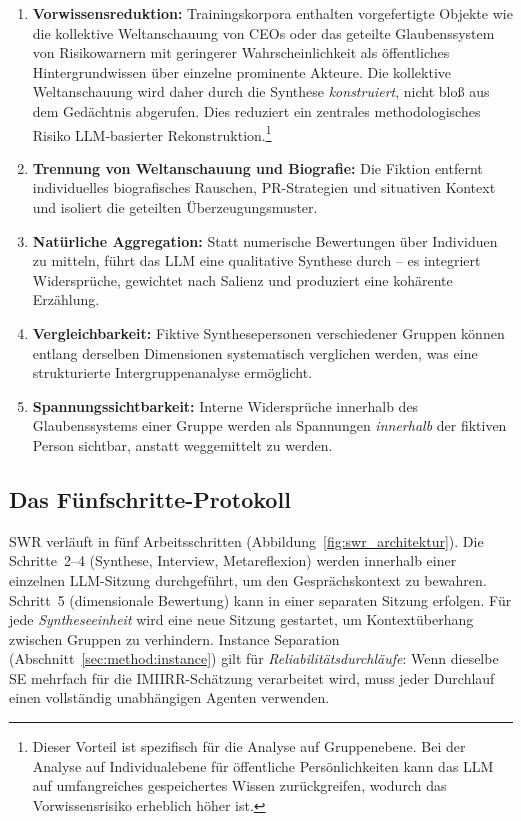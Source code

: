 \documentclass[11pt,a4paper]{article}
\begin{document}
\begin{enumerate}[nosep]
  \item \textbf{Vorwissensreduktion:} Trainingskorpora enthalten vorgefertigte Objekte wie \glqq{}die kollektive Weltanschauung von CEOs\grqq{} oder \glqq{}das geteilte Glaubenssystem von Risikowarnern\grqq{} mit geringerer Wahrscheinlichkeit als öffentliches Hintergrundwissen über einzelne prominente Akteure. Die kollektive Weltanschauung wird daher durch die Synthese \emph{konstruiert}, nicht bloß aus dem Gedächtnis abgerufen. Dies reduziert ein zentrales methodologisches Risiko LLM-basierter Rekonstruktion.\footnote{Dieser Vorteil ist spezifisch für die Analyse auf Gruppenebene. Bei der Analyse auf Individualebene für öffentliche Persönlichkeiten kann das LLM auf umfangreiches gespeichertes Wissen zurückgreifen, wodurch das Vorwissensrisiko erheblich höher ist.}
  \item \textbf{Trennung von Weltanschauung und Biografie:} Die Fiktion entfernt individuelles biografisches Rauschen, PR-Strategien und situativen Kontext und isoliert die geteilten Überzeugungsmuster.
  \item \textbf{Natürliche Aggregation:} Statt numerische Bewertungen über Individuen zu mitteln, führt das LLM eine qualitative Synthese durch -- es integriert Widersprüche, gewichtet nach Salienz und produziert eine kohärente Erzählung.
  \item \textbf{Vergleichbarkeit:} Fiktive Synthesepersonen verschiedener Gruppen können entlang derselben Dimensionen systematisch verglichen werden, was eine strukturierte Intergruppenanalyse ermöglicht.
  \item \textbf{Spannungssichtbarkeit:} Interne Widersprüche innerhalb des Glaubenssystems einer Gruppe werden als Spannungen \emph{innerhalb} der fiktiven Person sichtbar, anstatt weggemittelt zu werden.
\end{enumerate}


\subsection{Das Fünfschritte-Protokoll}
\label{sec:method:protocol}

SWR verläuft in fünf Arbeitsschritten (Abbildung~\ref{fig:swr_architektur}). Die Schritte~2--4 (Synthese, Interview, Metareflexion) werden innerhalb einer einzelnen LLM-Sitzung durchgeführt, um den Gesprächskontext zu bewahren. Schritt~5 (dimensionale Bewertung) kann in einer separaten Sitzung erfolgen. Für jede \emph{Syntheseeinheit} wird eine neue Sitzung gestartet, um Kontextüberhang zwischen Gruppen zu verhindern. Instance Separation (Abschnitt~\ref{sec:method:instance}) gilt für \emph{Reliabilitätsdurchläufe}: Wenn dieselbe SE mehrfach für die IMIIRR-Schätzung verarbeitet wird, muss jeder Durchlauf einen vollständig unabhängigen Agenten verwenden.
\end{document}
